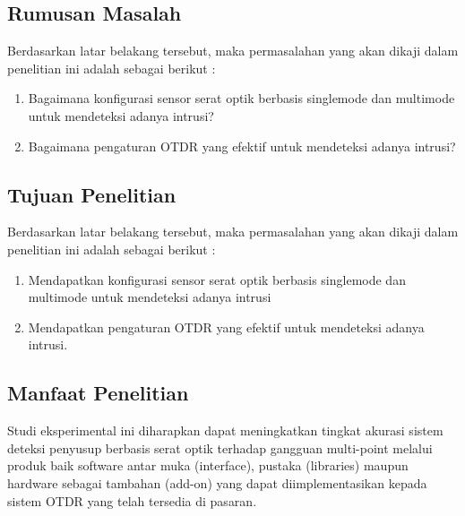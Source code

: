 \documentclass[12pt]{article}
\begin{document}
	
	
	\subsection{Rumusan Masalah}
	
	Berdasarkan latar belakang tersebut, maka permasalahan yang akan dikaji dalam penelitian ini adalah sebagai berikut :
	
	\begin{enumerate}
		\item Bagaimana konfigurasi sensor serat optik berbasis singlemode dan multimode untuk mendeteksi adanya intrusi?
		\item Bagaimana pengaturan OTDR yang efektif untuk mendeteksi adanya intrusi?
	\end{enumerate}



	\subsection{Tujuan Penelitian}

	Berdasarkan latar belakang tersebut, maka permasalahan yang akan dikaji dalam penelitian ini adalah sebagai berikut :
	
	\begin{enumerate}
		\item Mendapatkan konfigurasi sensor serat optik berbasis  singlemode dan multimode untuk mendeteksi adanya intrusi
		\item Mendapatkan pengaturan OTDR yang efektif untuk mendeteksi adanya intrusi. 
	\end{enumerate}


	\subsection{Manfaat Penelitian}
	
	Studi eksperimental ini diharapkan dapat meningkatkan tingkat akurasi sistem deteksi penyusup berbasis serat optik terhadap gangguan multi-point melalui produk baik software antar muka (interface), pustaka (libraries) maupun hardware sebagai tambahan (add-on) yang dapat diimplementasikan kepada sistem OTDR yang telah tersedia di pasaran.
	
\newpage
\thispagestyle{plain}
\mbox{}

\newpage
\end{document}
